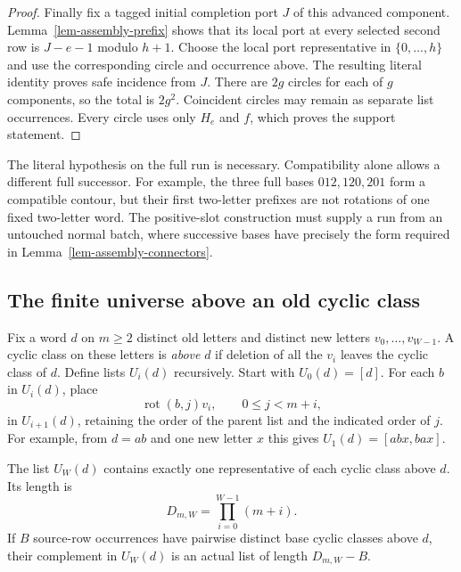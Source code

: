 \begin{proof}
Finally fix a tagged initial completion port $J$ of this advanced
component. Lemma~\ref{lem-assembly-prefix} shows that its local port at
every selected second row is $J-e-1$ modulo $h+1$. Choose the local port
representative in $\{0,\ldots,h\}$ and use the corresponding circle
and occurrence above. The resulting literal identity proves safe
incidence from $J$. There are $2g$ circles for each of $g$ components,
so the total is $2g^2$. Coincident circles may remain as separate list
occurrences. Every circle uses only $H_e$ and $f$, which proves the
support statement.
\end{proof}

The literal hypothesis on the full run is necessary. Compatibility alone
allows a different full successor. For example, the three full bases
$012,120,201$ form a compatible contour, but their first two-letter
prefixes are not rotations of one fixed two-letter word. The positive-slot
construction must supply a run from an untouched normal batch, where
successive bases have precisely the form required in
Lemma~\ref{lem-assembly-connectors}.

\subsection{The finite universe above an old cyclic class}

Fix a word $d$ on $m\ge2$ distinct old letters and distinct new letters
$v_0,\ldots,v_{W-1}$. A cyclic class on these letters is \emph{above}
$d$ if deletion of all the $v_i$ leaves the cyclic class of $d$.
Define lists $U_i(d)$ recursively. Start with $U_0(d)=[d]$. For each
$b$ in $U_i(d)$, place
\[
 \operatorname{rot}(b,j)v_i,\qquad 0\le j<m+i,
\]
in $U_{i+1}(d)$, retaining the order of the parent list and the indicated
order of $j$. For example, from $d=ab$ and one new letter $x$ this gives
$U_1(d)=[abx,bax]$.

\begin{lemma}\label{lem-assembly-universe}
The list $U_W(d)$ contains exactly one representative of each cyclic
class above $d$. Its length is
\[
 D_{m,W}=\prod_{i=0}^{W-1}(m+i).
\]
If $B$ source-row occurrences have pairwise distinct base cyclic classes
above $d$, their complement in $U_W(d)$ is an actual list of length
$D_{m,W}-B$.
\end{lemma}

